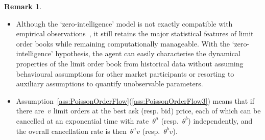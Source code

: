 \documentclass{amsart}[11pt]
\numberwithin{equation}{section}
\theoremstyle{definition}
\newtheorem{remark}[theorem]{Remark}
\begin{document}
\begin{remark}\ 
\begin{itemize}
\item Although the `zero-intelligence' model is not exactly compatible with empirical observations~\cite{zhao2010model}, 
it still retains the major statistical features of limit order books while remaining computationally manageable.
With the `zero-intelligence' hypothesis,
the agent can easily characterise the dynamical properties of the limit order book from historical data without assuming behavioural assumptions for other market participants or resorting to auxiliary assumptions to quantify unobservable parameters.
\item Assumption~\ref{ass:PoissonOrderFlow}(\ref{ass:PoissonOrderFlow3}) means that 
if there are~$v$ limit orders at the best ask (resp. bid) price, each of which can be cancelled at an exponential time with rate~$\theta^a$ (resp.~$\theta^b$) independently,
and the overall cancellation rate is then~$\theta^a v$ (resp.~$\theta^b v$).
\end{itemize}
\end{remark}
\end{document}
